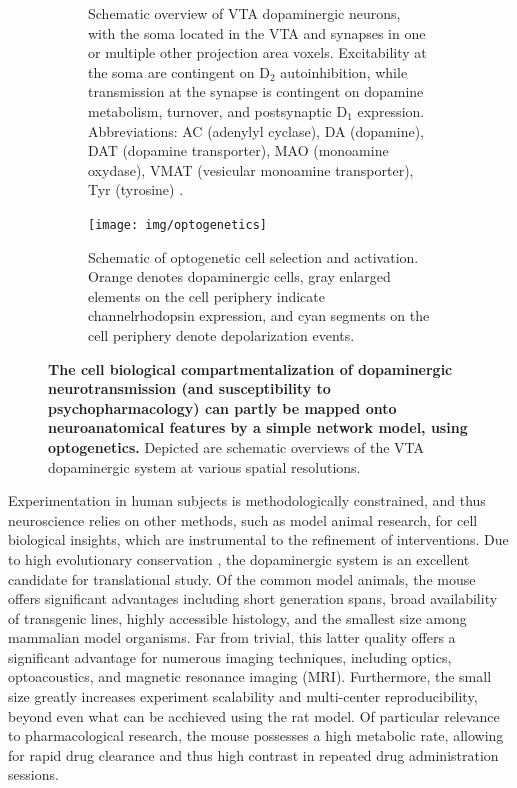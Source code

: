 \begin{sansmath}
\begin{figure}[h!]
\begin{subfigure}{.985\textwidth}
		\caption{
			Schematic overview of VTA dopaminergic neurons, with the soma located in the VTA and synapses in one or multiple other projection area voxels.
			Excitability at the soma are contingent on $\mathrm{D_2}$ autoinhibition, while transmission at the synapse is contingent on dopamine metabolism, turnover, and postsynaptic $\mathrm{D_1}$ expression.
			Abbreviations: AC (adenylyl cyclase), DA (dopamine), DAT (dopamine transporter), MAO (monoamine oxydase), VMAT (vesicular monoamine transporter), Tyr (tyrosine) \cite{Torres2003}.
			}
		\label{fig:cm}
	\end{subfigure}
	\begin{subfigure}{.985\textwidth}
		\centering
		\vspace{.5em}
		\texttt{[image: img/optogenetics]}
		\caption{
			Schematic of optogenetic cell selection and activation.
			Orange denotes dopaminergic cells, gray enlarged elements on the cell periphery indicate channelrhodopsin expression, and cyan segments on the cell periphery denote depolarization events.
			}
		\label{fig:og}
	\end{subfigure}
	\caption{
		\textbf{The cell biological compartmentalization of dopaminergic neurotransmission (and susceptibility to psychopharmacology) can partly be mapped onto neuroanatomical features by a simple network model, using optogenetics.}
		Depicted are schematic overviews of the VTA dopaminergic system at various spatial resolutions.
		}
	\label{fig:m}
\end{figure}
\end{sansmath}

Experimentation in human subjects is methodologically constrained, and thus neuroscience relies on other methods, such as model animal research, for cell biological insights, which are instrumental to the refinement of interventions.
Due to high evolutionary conservation \cite{Yamamoto2011}, the dopaminergic system is an excellent candidate for translational study.
Of the common model animals, the mouse offers significant advantages including short generation spans, broad availability of transgenic lines, highly accessible histology, and the smallest size among mammalian model organisms.
Far from trivial, this latter quality offers a significant advantage for numerous imaging techniques, including optics, optoacoustics, and magnetic resonance imaging (MRI).
Furthermore, the small size greatly increases experiment scalability and multi-center reproducibility, beyond even what can be acchieved using the rat model.
Of particular relevance to pharmacological research, the mouse possesses a high metabolic rate, allowing for rapid drug clearance and thus high contrast in repeated drug administration sessions.

